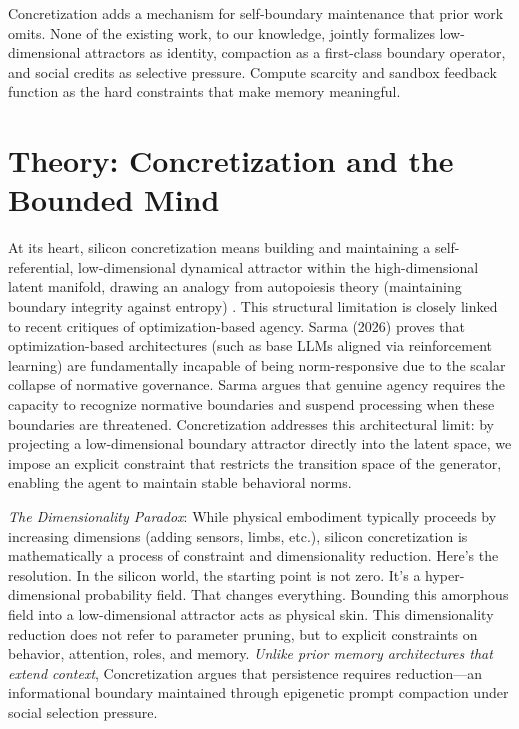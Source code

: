 \documentclass[10pt,journal,compsoc]{IEEEtran}
\begin{document}
Concretization adds a mechanism for self-boundary maintenance that prior work omits. None of the existing work, to our knowledge, jointly formalizes low-dimensional attractors as identity, compaction as a first-class boundary operator, and social credits as selective pressure. Compute scarcity and sandbox feedback function as the hard constraints that make memory meaningful.

\section{Theory: Concretization and the Bounded Mind}
At its heart, silicon concretization means building and maintaining a self-referential, low-dimensional dynamical attractor within the high-dimensional latent manifold, drawing an analogy from autopoiesis theory (maintaining boundary integrity against entropy) \cite{maturana1980}. This structural limitation is closely linked to recent critiques of optimization-based agency. Sarma (2026) \cite{sarma2026} proves that optimization-based architectures (such as base LLMs aligned via reinforcement learning) are fundamentally incapable of being norm-responsive due to the scalar collapse of normative governance. Sarma argues that genuine agency requires the capacity to recognize normative boundaries and suspend processing when these boundaries are threatened. Concretization addresses this architectural limit: by projecting a low-dimensional boundary attractor directly into the latent space, we impose an explicit constraint that restricts the transition space of the generator, enabling the agent to maintain stable behavioral norms.

\textit{The Dimensionality Paradox}: While physical embodiment typically proceeds by increasing dimensions (adding sensors, limbs, etc.), silicon concretization is mathematically a process of constraint and dimensionality reduction. Here's the resolution. In the silicon world, the starting point is not zero. It's a hyper-dimensional probability field. That changes everything. Bounding this amorphous field into a low-dimensional attractor acts as physical skin. This dimensionality reduction does not refer to parameter pruning, but to explicit constraints on behavior, attention, roles, and memory. \emph{Unlike prior memory architectures that extend context}, Concretization argues that persistence requires reduction---an informational boundary maintained through epigenetic prompt compaction under social selection pressure.
\end{document}
